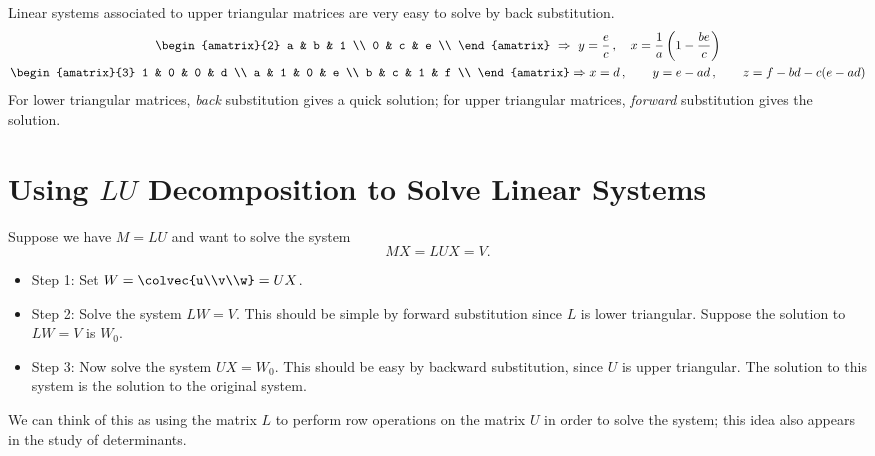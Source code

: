 \begin{example}
Linear systems associated to upper triangular matrices are very easy to solve by back substitution.
\begin{gather*}
\begin{amatrix}{2}
a & b & 1 \\
0 & c & e \\
\end{amatrix} \ \Rightarrow \ y=\frac{e}{c}\, , \quad x=\frac{1}{a}\left(1-\frac{be}{c}\right)
\\
\begin{amatrix}{3}
1 & 0 & 0 & d \\
a & 1 & 0 & e \\
b & c & 1 & f \\
\end{amatrix} \Rightarrow x=d\, , \qquad y=e-ad\, , \qquad z=f-bd-c(e-ad)
\end{gather*}
For lower triangular matrices, \emph{back} substitution gives a quick solution; for upper triangular matrices, \emph{forward} substitution gives the solution.
\end{example}





\section{Using $LU$ Decomposition to Solve Linear Systems}

Suppose we have $M=LU$ and want to solve the system
\[
MX=LUX=V.
\]

\begin{itemize}
\item{Step 1:} Set $W=\colvec{u\\v\\w}=UX$.  

\item{Step 2:} Solve the system $LW=V$.  This should be simple by forward substitution since $L$ is lower triangular.  Suppose the solution to $LW=V$ is $W_0$.  

\item{Step 3:} Now solve the system $UX=W_0$.  This should be easy by backward substitution, since $U$ is upper triangular.  The solution to this system is the solution to the original system.
\end{itemize}
We can think of this as using the matrix $L$ to perform row operations on the matrix $U$ in order to solve the system; this idea also appears in the  study of determinants.

